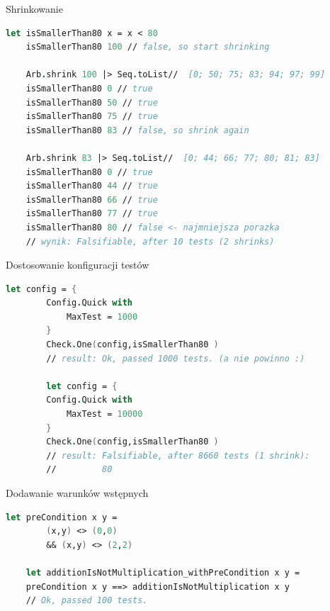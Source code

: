     \begin{frame}[fragile]{Shrinkowanie}
        \begin{lstlisting}[language=FSharp, xleftmargin=-10pt,xrightmargin=-10pt,numbers=none,basicstyle=\ttfamily\small]
    let isSmallerThan80 x = x < 80
    isSmallerThan80 100 // false, so start shrinking

    Arb.shrink 100 |> Seq.toList//  [0; 50; 75; 83; 94; 97; 99]
    isSmallerThan80 0 // true
    isSmallerThan80 50 // true
    isSmallerThan80 75 // true
    isSmallerThan80 83 // false, so shrink again

    Arb.shrink 83 |> Seq.toList//  [0; 44; 66; 77; 80; 81; 83]
    isSmallerThan80 0 // true
    isSmallerThan80 44 // true
    isSmallerThan80 66 // true
    isSmallerThan80 77 // true
    isSmallerThan80 80 // false <- najmniejsza porazka
    // wynik: Falsifiable, after 10 tests (2 shrinks)
        \end{lstlisting}
    \end{frame}
    
    \begin{frame}[fragile]{Dostosowanie konfiguracji testów}
    \begin{lstlisting}[language=FSharp, xleftmargin=-10pt,xrightmargin=-10pt,numbers=none]
    let config = {
        Config.Quick with
            MaxTest = 1000
        }
        Check.One(config,isSmallerThan80 )
        // result: Ok, passed 1000 tests. (a nie powinno :)
        
        let config = {
        Config.Quick with
            MaxTest = 10000
        }
        Check.One(config,isSmallerThan80 )
        // result: Falsifiable, after 8660 tests (1 shrink):
        //         80
    \end{lstlisting}
    \end{frame}
    
    \begin{frame}[fragile]{Dodawanie warunków wstępnych}
    \begin{lstlisting}[language=FSharp, xleftmargin=-10pt,xrightmargin=-10pt,numbers=none]
    let preCondition x y =
        (x,y) <> (0,0)
        && (x,y) <> (2,2)

    let additionIsNotMultiplication_withPreCondition x y =
    preCondition x y ==> additionIsNotMultiplication x y
    // Ok, passed 100 tests.
    \end{lstlisting}
    \end{frame}
    
